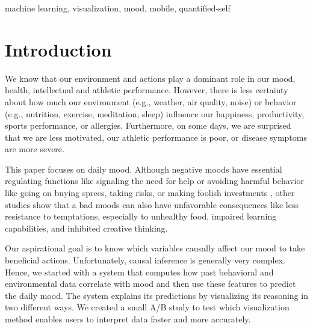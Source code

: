\documentclass[conference]{IEEEtran}
\begin{document}
\begin{IEEEkeywords}
machine learning, visualization, mood, mobile, quantified-self
\end{IEEEkeywords}

\section{Introduction}
We know that our environment and actions play a dominant role in our mood, health, intellectual and athletic performance.
However, there is less certainty about how much our environment (e.g., weather, air quality, noise) or behavior (e.g., nutrition, exercise, meditation, sleep) influence our happiness, productivity, sports performance, or allergies.
Furthermore, on some days, we are surprised that we are less motivated, our athletic performance is poor, or disease symptoms are more severe.

This paper focuses on daily mood. Although negative moods have essential regulating functions like signaling the need for help or avoiding harmful behavior like going on buying sprees, taking risks, or making foolish investments \cite{noauthor_bipolar_nodate}, other studies show that a bad moods can also have unfavorable consequences like less resistance to temptations, especially to unhealthy food\cite{fedorikhin_positive_2010}, impaired learning capabilities,\cite{brand_how_2007} and inhibited creative thinking\cite{vosburg_effects_1998}.

Our aspirational goal is to know which variables causally affect our mood to take beneficial actions. Unfortunately, causal inference is generally very complex. Hence, we started with a system that computes how past behavioral and environmental data correlate with mood and then use these features to predict the daily mood. 
The system explains its predictions by visualizing its reasoning in two different ways. We created a small A/B study to test which visualization method enables users to interpret data faster and more accurately.


\end{document}
